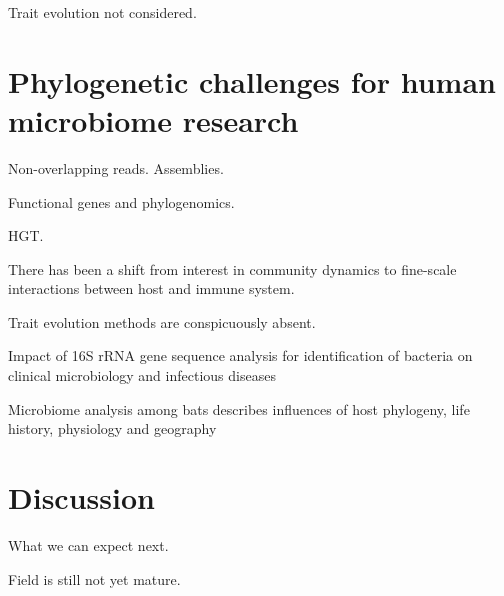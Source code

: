 \documentclass{amsart}
\newcommand{\forarxiv}[1]{#1}
\newcommand{\notforarxiv}[1]{}
\newcommand{\FIGmassTransport}{\
\begin{figure}[ht]
\begin{center}
  \forarxiv{\texttt{[image: mass\_transport.pdf]}}
\end{center}
\caption{\
  Caption goes here.
}
\label{FIGmassTransport}
\end{figure}
}
\begin{document}
Trait evolution not considered.


\section{Phylogenetic challenges for human microbiome research}

Non-overlapping reads.
Assemblies.

Functional genes and phylogenomics.

HGT.

There has been a shift from interest in community dynamics to fine-scale interactions between host and immune system.

Trait evolution methods are conspicuously absent.

\cite{wylie2012sequence}
\cite{chen2012associating}

\cite{clarridge2004}
{{I}mpact of 16{S} r{RNA} gene sequence analysis for identification of bacteria on clinical microbiology and infectious diseases}

\cite{phillips2012microbiome}
Microbiome analysis among bats describes influences of host phylogeny, life history, physiology and geography



\section{Discussion}

What we can expect next.

Field is still not yet mature.

\notforarxiv{
\newpage
\section{Figure Legends}
\clearpage

\newpage
}



\end{document}
